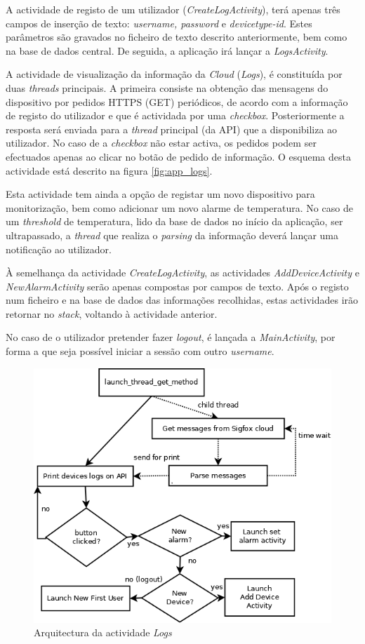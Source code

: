 \documentclass[a4paper]{article}
\begin{document}
A actividade de registo de um utilizador (\textit{CreateLogActivity}), terá apenas três campos de inserção de texto: \textit{username, password} e \textit{devicetype-id}. Estes parâmetros são gravados no ficheiro de texto descrito anteriormente, bem como na base de dados central. De seguida, a aplicação irá lançar a \textit{LogsActivity}.

A actividade de visualização da informação da \textit{Cloud} (\textit{Logs}), é constituída por duas \textit{threads} principais. A primeira consiste na obtenção das mensagens do dispositivo por pedidos HTTPS (GET) periódicos, de acordo com a informação de registo do utilizador e que é actividada por uma \textit{checkbox}. Posteriormente a resposta será enviada para a \textit{thread} principal (da API) que a disponibiliza ao utilizador. No caso de a \textit{checkbox} não estar activa, os pedidos podem ser efectuados apenas ao clicar no botão de pedido de informação. O esquema desta actividade está descrito na figura \autoref{fig:app_logs}.

Esta actividade tem ainda a opção de registar um novo dispositivo para monitorização, bem como adicionar um novo alarme de temperatura. No caso de um \textit{threshold} de temperatura, lido da base de dados no início da aplicação, ser ultrapassado, a \textit{thread} que realiza o \textit{parsing} da informação deverá lançar uma notificação ao utilizador.

À semelhança da actividade \textit{CreateLogActivity}, as actividades \textit{AddDeviceActivity} e \textit{NewAlarmActivity} serão apenas compostas por campos de texto. Após o registo num ficheiro e na base de dados das informações recolhidas, estas actividades irão retornar no \textit{stack}, voltando à actividade anterior.

No caso de o utilizador pretender fazer \textit{logout}, é lançada a \textit{MainActivity}, por forma a que seja possível iniciar a sessão com outro \textit{username}.

\begin{figure}[H]
  \centering
  \includegraphics[scale=0.40]{ShowLogs.png}
  \caption{Arquitectura da actividade \textit{Logs}}
  \label{fig:app_logs}
\end{figure}
\end{document}
